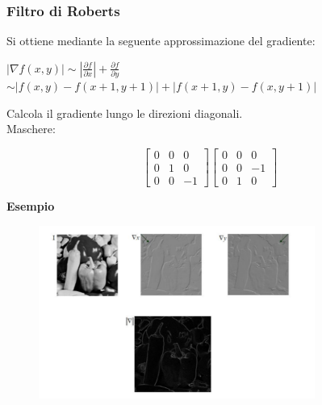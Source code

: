 \subsubsection{Filtro di Roberts}
Si ottiene mediante la seguente approssimazione del gradiente:
\begin{center}
    $|\nabla f(x,y)| \sim |\frac{\partial{f}}{\partial{x}}| + \frac{\partial{f}}{\partial{y}}$
    \\ $\sim |f(x,y) - f(x+1, y+1)| + |f(x+1, y) - f(x,y+1)|$
\end{center}
Calcola il gradiente lungo le direzioni diagonali.
\\Maschere:
\begin{center}
    \[
        \begin{bmatrix}
            0 & 0 & 0  \\
            0 & 1 & 0  \\
            0 & 0 & -1
        \end{bmatrix}
        \begin{bmatrix}
            0 & 0 & 0  \\
            0 & 0 & -1 \\
            0 & 1 & 0
        \end{bmatrix}
    \]
\end{center}
\textbf{Esempio}
\begin{figure}[H]
    \centering
    \includegraphics[width=\linewidth, keepaspectratio]{capitoli/immagini/imgs/roberts.png}
\end{figure}


